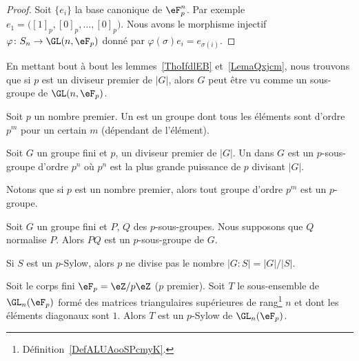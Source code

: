 \begin{proof}
	Soit \( \{ e_i \}\) la base canonique de \( \eF_p^n\). Par exemple \( e_1=\big( [1]_p,[0]_p,\ldots, [0]_p \big)\). Nous avons le morphisme injectif \( \varphi\colon S_n\to \GL(n,\eF_p)\) donné par \( \varphi(\sigma)e_i=e_{\sigma(i)}\).
\end{proof}

\begin{remark}  \label{RemFzxxst}
	En mettant bout à bout les lemmes~\ref{ThoIfdlEB} et~\ref{LemaQxjcm}, nous trouvons que si \( p\) est un diviseur premier de \( | G |\), alors \( G\) peut être vu comme un sous-groupe de \( \GL(n,\eF_p)\).
\end{remark}

\begin{definition}[\( p\)-groupe]      \label{DEFooPRCHooVZdwST}
	Soit \( p\) un nombre premier. Un  est un groupe dont tous les éléments sont d'ordre \( p^m\) pour un certain \( m\) (dépendant de l'élément).
\end{definition}

\begin{definition}[\( p\)-Syllow]	\label{DEFooMOZCooJJSDNO}
	Soit \( G\) un groupe fini et \( p\), un diviseur premier de \( | G |\). Un  dans \( G\) est un \( p\)-sous-groupe d'ordre \( p^n\) où \( p^n\) est la plus grande puissance de \( p\) divisant \( | G |\).
\end{definition}
Notons que si \( p\) est un nombre premier, alors tout groupe d'ordre \( p^m\) est un \( p\)-groupe.

\begin{lemma}
	Soit \( G\) un groupe fini et \( P\), \( Q\) des \( p\)-sous-groupes. Nous supposons que \( Q\) normalise \( P\). Alors \( PQ\) est un \( p\)-sous-groupe de \( G\).
\end{lemma}

Si \( S\) est un \( p\)-Sylow, alors \( p\) ne divise pas le nombre \( | G:S |=| G |/| S |\).

\begin{proposition}     \label{Propvocmon}
	Soit le corps fini \( \eF_p=\eZ/p\eZ\) (\( p\) premier). Soit \( T\) le sous-ensemble de \( \GL_n(\eF_p)\) formé des matrices triangulaires supérieures de rang\footnote{Définition~\ref{DefALUAooSPcmyK}.} \( n\) et dont les éléments diagonaux sont \( 1\). Alors \( T\) est un \( p\)-Sylow de \( \GL_n(\eF_p)\).
\end{proposition}


